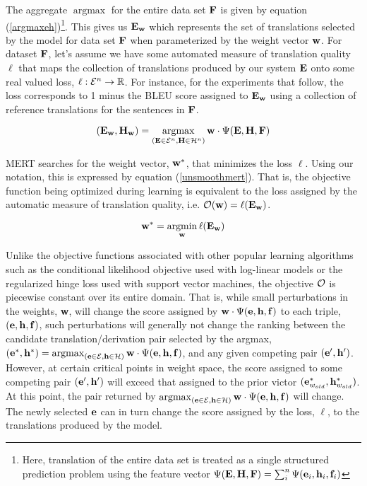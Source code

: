 \documentclass[11pt]{article}
\DeclareMathOperator*{\argmax}{argmax}
\DeclareMathOperator*{\argmin}{argmin}
\begin{document}
The aggregate $\argmax$ for the entire data set ${\bf F}$ is given by equation (\ref{argmaxeh})\footnote{Here, translation of the entire data set is treated as a single structured prediction problem using the feature vector  $\Psi({\bf E}, {\bf H}, {\bf F}) = \sum_i^n \Psi({\bf e}_i, {\bf h}_i, {\bf f}_i)$}. This gives us ${\bf E}_{\bf w}$ which represents the set of translations selected by the model for data set ${\bf F}$ when parameterized by the weight vector ${\bf w}$. For dataset ${\bf F}$, let's assume we have some automated measure of translation quality $\ell$ that maps the collection of translations produced by our system ${\bf E}$ onto some real valued loss, $\ell:{\cal E}^n\rightarrow \mathbb{R}$. For instance, for the experiments that follow, the loss corresponds to 1 minus the BLEU score assigned to ${\bf E}_{\bf w}$ using a collection of reference translations for the sentences in ${\bf F}$. 

\begin{equation}
({\bf E}_{\bf w}, {\bf H}_{\bf w}) = \argmax_{({\bf E} \in {\cal E}^n, {\bf H} \in {\cal H}^n)} {\bf w} \cdot \Psi({\bf E}, {\bf H}, {\bf F})
\label{argmaxeh}
\end{equation}

MERT searches for the weight vector, ${\bf w}^*$, that minimizes the loss $\ell$. Using our notation, this is expressed by equation (\ref{unsmoothmert}). That is, the objective function being optimized during learning is equivalent to the loss assigned by the automatic measure of translation quality, i.e. ${\cal O}({\bf w}) = \ell ({\bf E}_{\bf w})$.

\begin{equation}
{\bf w}^* = \argmin_{\bf w} \ell ({\bf E}_{\bf w}) 
\label{unsmoothmert}
\end{equation}

Unlike the objective functions associated with other popular learning algorithms such as the conditional likelihood objective used with log-linear models or the regularized hinge loss used with support vector machines, the objective ${\cal O}$ is piecewise constant over its entire domain. That is, while small perturbations in the weights, {\bf w}, will change the score assigned by ${\bf w} \cdot \Psi({\bf e}, {\bf h}, {\bf f})$ to each triple, $({\bf e}, {\bf h}, {\bf f})$, such perturbations will generally not change the ranking between the candidate translation/derivation pair selected by the argmax,  $({\bf e}^*, {\bf h}^*) = \argmax_{({\bf e} \in {\cal E}, {\bf h} \in {\cal H})} {\bf w} \cdot \Psi({\bf e}, {\bf h}, {\bf f})$, and any given competing pair $({\bf e}^\prime, {\bf h}^\prime)$. However, at certain critical points in weight space, the score assigned to some competing pair $({\bf e}^\prime, {\bf h}^\prime)$ will exceed that assigned to the prior victor  $({\bf e}^*_{w_{old}}, {\bf h}^*_{w_{old}})$. At this point, the pair returned by $\argmax_{({\bf e} \in {\cal E}, {\bf h} \in {\cal H})} {\bf w} \cdot \Psi({\bf e}, {\bf h}, {\bf f})$ will change. The newly selected ${\bf e}$  can in turn change the score assigned by the loss, $\ell$, to the translations produced by the model.
\end{document}

